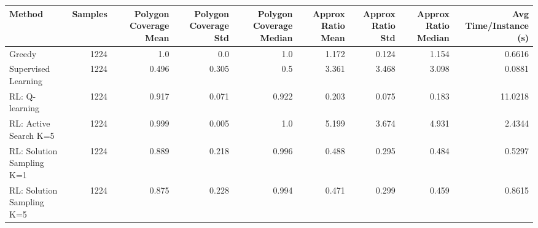 \begin{tabular}{lrrrrrrrr}
    \toprule
Method & Samples & Polygon Coverage Mean & Polygon Coverage Std & Polygon Coverage Median & Approx Ratio Mean & Approx Ratio Std & Approx Ratio Median & Avg Time/Instance (s) \\
    \midrule
Greedy & 1224 & 1.0 & 0.0 & 1.0 & 1.172 & 0.124 & 1.154 & 0.6616 \\
Supervised Learning & 1224 & 0.496 & 0.305 & 0.5 & 3.361 & 3.468 & 3.098 & 0.0881 \\
RL: Q-learning & 1224 & 0.917 & 0.071 & 0.922 & 0.203 & 0.075 & 0.183 & 11.0218 \\
RL: Active Search K=5 & 1224 & 0.999 & 0.005 & 1.0 & 5.199 & 3.674 & 4.931 & 2.4344 \\
RL: Solution Sampling K=1 & 1224 & 0.889 & 0.218 & 0.996 & 0.488 & 0.295 & 0.484 & 0.5297 \\
RL: Solution Sampling K=5 & 1224 & 0.875 & 0.228 & 0.994 & 0.471 & 0.299 & 0.459 & 0.8615 \\
    \bottomrule
\end{tabular}
